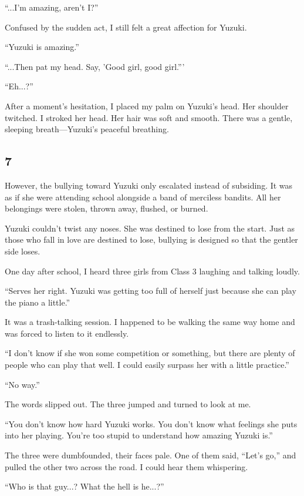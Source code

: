 \documentclass[
    a4paper,
    12pt,
    twoside,
    openany,
    UTF8,
    fontset=windows
]{ctexbook}
\begin{document}
``...I'm amazing, aren't I?''

Confused by the sudden act, I still felt a great affection for Yuzuki.

``Yuzuki is amazing.''

``...Then pat my head. Say, 'Good girl, good girl.'''

``Eh...?''

After a moment's hesitation, I placed my palm on Yuzuki's head. Her shoulder twitched. I stroked her head. Her hair was soft and smooth. There was a gentle, sleeping breath---Yuzuki's peaceful breathing.


\subsection*{7}

However, the bullying toward Yuzuki only escalated instead of subsiding. It was as if she were attending school alongside a band of merciless bandits. All her belongings were stolen, thrown away, flushed, or burned.

Yuzuki couldn't twist any noses. She was destined to lose from the start. Just as those who fall in love are destined to lose, bullying is designed so that the gentler side loses.

One day after school, I heard three girls from Class 3 laughing and talking loudly.

``Serves her right. Yuzuki was getting too full of herself just because she can play the piano a little.''

It was a trash-talking session. I happened to be walking the same way home and was forced to listen to it endlessly.

``I don't know if she won some competition or something, but there are plenty of people who can play that well. I could easily surpass her with a little practice.''

``No way.''

The words slipped out. The three jumped and turned to look at me.

``You don't know how hard Yuzuki works. You don't know what feelings she puts into her playing. You're too stupid to understand how amazing Yuzuki is.''

The three were dumbfounded, their faces pale. One of them said, ``Let's go,'' and pulled the other two across the road. I could hear them whispering.

``Who is that guy...? What the hell is he...?''
\end{document}
